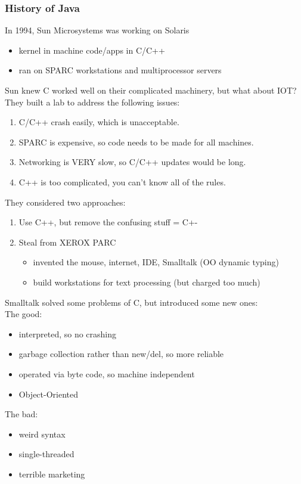 \documentclass[../../lecture_notes.tex]{subfiles}
\begin{document}
\subsubsection*{History of Java}
In 1994, Sun Microsystems was working on Solaris
\begin{itemize} [itemsep=0mm]
	\item kernel in machine code/apps in C/C++
	\item ran on SPARC workstations and multiprocessor servers
\end{itemize}
\noindent Sun knew C worked well on their complicated machinery, but what about IOT?
They built a lab to address the following issues:
\begin{enumerate} [itemsep=0mm]
	\item C/C++ crash easily, which is unacceptable.
	\item SPARC is expensive, so code needs to be made for all machines.
	\item Networking is VERY slow, so C/C++ updates would be long.
	\item C++ is too complicated, you can’t know all of the rules.
\end{enumerate}
 They considered two approaches:
 \begin{enumerate} [itemsep=0mm]
 	\item Use C++, but remove the confusing stuff = C+-
 	\item Steal from XEROX PARC
		\begin{itemize} [itemsep=0mm]
			\item invented the mouse, internet, IDE, Smalltalk (OO dynamic typing)
			\item build workstations for text processing (but charged too much)
		\end{itemize}
\end{enumerate}
\noindent Smalltalk solved some problems of C, but introduced some new ones:\\
\indent The good: \begin{itemize} [itemsep=0mm]
	\item interpreted, so no crashing
	\item garbage collection rather than new/del, so more reliable
	\item operated via byte code, so machine independent
	\item Object-Oriented
\end{itemize}
The bad: \begin{itemize} [itemsep=0mm]
	\item weird syntax
	\item single-threaded
	\item terrible marketing
\end{itemize}
\end{document}

